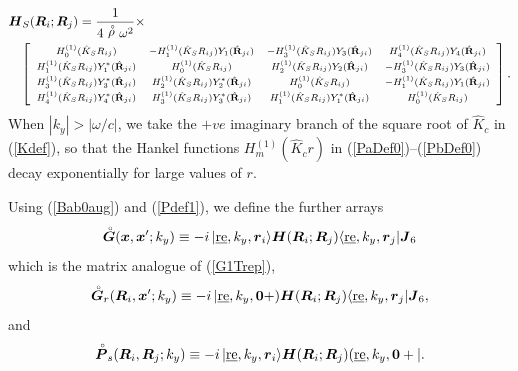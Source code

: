 \begin{eqnarray} \label{PbDef0} 
\lefteqn{
{\bmi H}_{S}({\bmi R}_{i};{\bmi R}_{j})=\frac{1}{4 \rf{\rho} \omega^2}\times}\\
 && \left[{\begin{array}{cccc} 
\scriptstyle{H}^{(1)}_{0}(\hat{K}_{S}{R}_{ij})&\scriptstyle-{H}^{(1)}_{1}
(\hat{K}_{S}{R}_{ij})Y_{1}(\hat{\bf R}_{ji})&\scriptstyle-
{H}^{(1)}_{3}(\hat{K}_{S}{R}_{ij})Y_{3}(\hat{\bf R}_{ji})&
\scriptstyle{H}^{(1)}_{4}(\hat{K}_{S}{R}_{ij})Y_{4}(\hat{\bf R}_{ji})\\ 
\scriptstyle {H}^{(1)}_{1}(\hat{K}_{S}{R}_{ij})Y_{1}^{\ast}(\hat{\bf R}_{ji})&
\scriptstyle{H}^{(1)}_{0}(\hat{K}_{S}{R}_{ij})&\scriptstyle
{H}^{(1)}_{2}(\hat{K}_{S}{R}_{ij})Y_{2}(\hat{\bf R}_{ji})&\scriptstyle-
{H}^{(1)}_{3}(\hat{K}_{S}{R}_{ij})Y_{3}(\hat{\bf R}_{ji})\\ \scriptstyle 
{H}^{(1)}_{3}(\hat{K}_{S}{R}_{ij})Y_{3}^{\ast}(\hat{\bf R}_{ji})&
\scriptstyle{H}^{(1)}_{2}(\hat{K}_{S}{R}_{ij})Y_{2}^{\ast}(\hat{\bf R}_{ji})&\scriptstyle{H}^{(1)}_{0}(\hat{K}_{S}{R}_{ij})&\scriptstyle-{H}^{(1)}_{1}
(\hat{K}_{S}{R}_{ij})Y_{1}(\hat{\bf R}_{ji})\\ \scriptstyle 
{H}^{(1)}_{4}(\hat{K}_{S}{R}_{ij})Y_{4}^{\ast}(\hat{\bf R}_{ji})&
\scriptstyle{H}^{(1)}_{3}(\hat{K}_{S}{R}_{ij})Y_{3}^{\ast}(\hat{\bf R}_{ji})&
\scriptstyle{H}^{(1)}_{1}(\hat{K}_{S}{R}_{ij})Y_{1}^{\ast}(\hat{\bf R}_{ji})&\scriptstyle{H}^{(1)}_{0}(\hat{K}_{S}{R}_{ij}) 
\end{array}}\right].\nonumber 
\end{eqnarray} 
When $|k_y| > |\omega/c|$, we take the $+ve$ imaginary 
branch of the square root of $\hat{K}_c$ in (\ref{Kdef}), so that the Hankel 
functions  ${H}^{(1)}_{m}(\hat{K}_{c}r)$ in (\ref{PaDef0})--(\ref{PbDef0})
decay exponentially for large values of $r$.





Using (\ref{Bab0aug}) and (\ref{Pdef1}), we define the further arrays
\begin{equation}	\label{G1mat}
{\stackrel{\scriptscriptstyle _{\,\,\circ}}{ \mbox{\boldmath$\mit G$\unboldmath}}}({\mbox{\boldmath$\mit x$\unboldmath}},{\mbox{\boldmath$\mit x$\unboldmath}}^{\prime};k_y)
		\equiv -i\,
	|\underline{\mbox{re}},k_y,{\mbox{\boldmath$\mit r$\unboldmath}}_{i}\rangle {{\mbox{\boldmath$\mit H$\unboldmath}}}({\mbox{\boldmath$\mit R$\unboldmath}}_{i};{\mbox{\boldmath$\mit R$\unboldmath}}_{j})
	\langle\underline{\mbox{re}},k_y,{\mbox{\boldmath$\mit r$\unboldmath}}_{j}|{\mbox{\boldmath$\mit J$\unboldmath}}_{6}
\end{equation}
which is the matrix analogue of (\ref{G1Trep}),
\begin{equation}	\label{Grmat}
{\stackrel{\scriptscriptstyle _{\,\,\circ}}{ \mbox{\boldmath$\mit G$\unboldmath}}_{r}}({\mbox{\boldmath$\mit R$\unboldmath}}_{i},{\mbox{\boldmath$\mit x$\unboldmath}}^{\prime};k_y)
		\equiv -i\,
	|\underline{\mbox{re}},k_y,{\bf 0}+) {{\mbox{\boldmath$\mit H$\unboldmath}}}({\mbox{\boldmath$\mit R$\unboldmath}}_{i};{\mbox{\boldmath$\mit R$\unboldmath}}_{j})
	\langle\underline{\mbox{re}},k_y,{\mbox{\boldmath$\mit r$\unboldmath}}_{j}|{\mbox{\boldmath$\mit J$\unboldmath}}_{6},
\end{equation}
and
\begin{equation}	\label{Psmat}
{\stackrel{\scriptscriptstyle _{\,\,\circ}}{ \mbox{\boldmath$\mit P$\unboldmath}}_{s}}({\mbox{\boldmath$\mit R$\unboldmath}}_{i},{\mbox{\boldmath$\mit R$\unboldmath}}_{j};k_y)
		\equiv -i\,
	|\underline{\mbox{re}},k_y,{\mbox{\boldmath$\mit r$\unboldmath}}_{i}\rangle {{\mbox{\boldmath$\mit H$\unboldmath}}}({\mbox{\boldmath$\mit R$\unboldmath}}_{i};{\mbox{\boldmath$\mit R$\unboldmath}}_{j})
	(\underline{\mbox{re}},k_y,{\bf 0}+|.
\end{equation}



